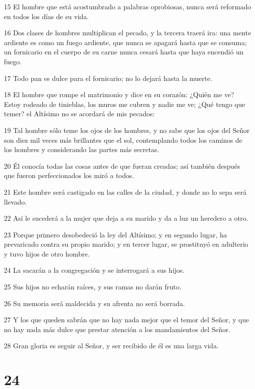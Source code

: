 \par 15 El hombre que está acostumbrado a palabras oprobiosas, nunca será reformado en todos los días de su vida.
\par 16 Dos clases de hombres multiplican el pecado, y la tercera traerá ira: una mente ardiente es como un fuego ardiente, que nunca se apagará hasta que se consuma; un fornicario en el cuerpo de su carne nunca cesará hasta que haya encendió un fuego.
\par 17 Todo pan es dulce para el fornicario; no lo dejará hasta la muerte.
\par 18 El hombre que rompe el matrimonio y dice en su corazón: ¿Quién me ve? Estoy rodeado de tinieblas, los muros me cubren y nadie me ve; ¿Qué tengo que temer? el Altísimo no se acordará de mis pecados:
\par 19 Tal hombre sólo teme los ojos de los hombres, y no sabe que los ojos del Señor son diez mil veces más brillantes que el sol, contemplando todos los caminos de los hombres y considerando las partes más secretas.
\par 20 Él conocía todas las cosas antes de que fueran creadas; así también después que fueron perfeccionados los miró a todos.
\par 21 Este hombre será castigado en las calles de la ciudad, y donde no lo sepa será llevado.
\par 22 Así le sucederá a la mujer que deja a su marido y da a luz un heredero a otro.
\par 23 Porque primero desobedeció la ley del Altísimo; y en segundo lugar, ha prevaricado contra su propio marido; y en tercer lugar, se prostituyó en adulterio y tuvo hijos de otro hombre.
\par 24 La sacarán a la congregación y se interrogará a sus hijos.
\par 25 Sus hijos no echarán raíces, y sus ramas no darán fruto.
\par 26 Su memoria será maldecida y su afrenta no será borrada.
\par 27 Y los que queden sabrán que no hay nada mejor que el temor del Señor, y que no hay nada más dulce que prestar atención a los mandamientos del Señor.
\par 28 Gran gloria es seguir al Señor, y ser recibido de él es una larga vida.

\chapter{24}

